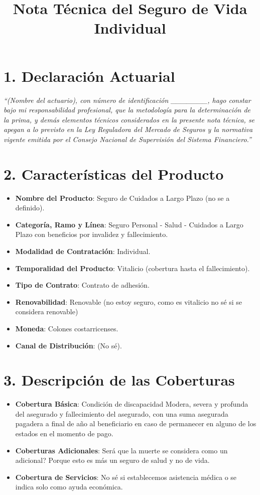 \documentclass{article}
\title{Nota Técnica del Seguro de Vida Individual}
\date{}
\begin{document}
	
	\maketitle
	
	\section*{1. Declaración Actuarial}
	\textit{``(Nombre del actuario), con número de identificación \_\_\_\_\_\_\_, hago constar bajo mi responsabilidad profesional, que la metodología para la determinación de la prima, y demás elementos técnicos considerados en la presente nota técnica, se apegan a lo previsto en la Ley Reguladora del Mercado de Seguros y la normativa vigente emitida por el Consejo Nacional de Supervisión del Sistema Financiero.''}
	
	\section*{2. Características del Producto}
	\begin{itemize}
		\item \textbf{Nombre del Producto}: Seguro de Cuidados a Largo Plazo (no se a definido).
		\item \textbf{Categoría, Ramo y Línea}: Seguro Personal - Salud - Cuidados a Largo Plazo con beneficios por invalidez y fallecimiento.
		\item \textbf{Modalidad de Contratación}: Individual.
		\item \textbf{Temporalidad del Producto}: Vitalicio (cobertura hasta el fallecimiento).
		\item \textbf{Tipo de Contrato}: Contrato de adhesión.
		\item \textbf{Renovabilidad}: Renovable (no estoy seguro, como es vitalicio no sé si se considera renovable)
		\item \textbf{Moneda}: Colones costarricenses.
		\item \textbf{Canal de Distribución}: (No sé).
	\end{itemize}
	
	\section*{3. Descripción de las Coberturas}
	\begin{itemize}
		\item \textbf{Cobertura Básica}: Condición de discapacidad Modera, severa y profunda del asegurado y fallecimiento del asegurado, con una suma asegurada pagadera a final de año al beneficiario en caso de permanecer en alguno de los estados en el momento de pago.
		
		\item \textbf{Coberturas Adicionales}: Será que la muerte se considera como un adicional? Porque esto es más un seguro de salud y no de vida.
		\item \textbf{Cobertura de Servicios}: No sé si establecemos asistencia médica o se indica solo como ayuda económica.
	\end{itemize}
	
\end{document}
